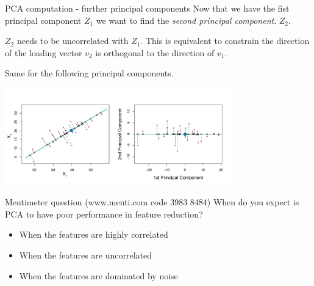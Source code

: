 \documentclass[notes]{beamer}          %
\begin{document}
\begin{frame}{PCA computation - further principal components}
Now that we have the fist principal component $Z_1$ we want to find the \textit{second principal component}. $Z_2$. 

\vspace{2mm} 

$Z_2$ needs to be uncorrelated with $Z_1$. This is equivalent to constrain the direction of the loading vector $v_2$  is orthogonal to the direction of $v_1$.

\vspace{2mm} 
 
 Same for the following principal components.
 
 \begin{center}
\includegraphics[height=4.2cm]{../figures/week_6/PCA_geometrical_part2.pdf}  
\end{center}
 

\end{frame}

\begin{frame}{Mentimeter question (www.menti.com code 3983 8484)}
When do you expect is PCA to have poor performance in feature reduction?
\begin{itemize}
\item When the features are highly correlated
\item When the features are uncorrelated
\item When the features are dominated by noise
\end{itemize}
\end{frame}
\end{document}
